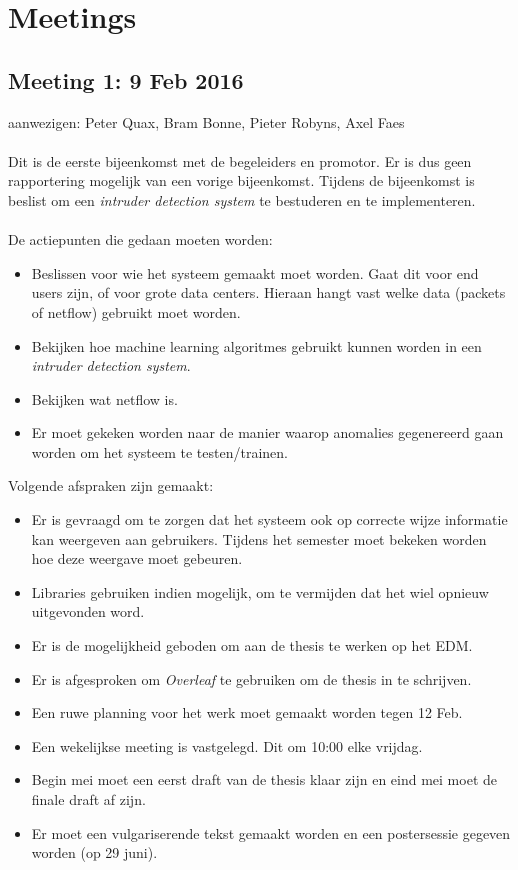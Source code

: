 
\chapter{Meetings} %

\label{AppendixA} %

\section{Meeting 1: 9 Feb 2016}

aanwezigen: Peter Quax, Bram Bonne, Pieter Robyns, Axel Faes\\
\\
Dit is de eerste bijeenkomst met de begeleiders en promotor. Er is dus geen rapportering mogelijk van een vorige bijeenkomst. Tijdens de bijeenkomst is beslist om een \textit{intruder detection system} te bestuderen en te implementeren. \\
\\
De actiepunten die gedaan moeten worden:
\begin{itemize}  
        \item Beslissen voor wie het systeem gemaakt moet worden. Gaat dit voor end users zijn, of voor grote data centers. Hieraan hangt vast welke data (packets of netflow) gebruikt moet worden.
        \item Bekijken hoe machine learning algoritmes gebruikt kunnen worden in een \textit{intruder detection system}.
        \item Bekijken wat netflow is.
        \item Er moet gekeken worden naar de manier waarop anomalies gegenereerd gaan worden om het systeem te testen/trainen.
\end{itemize}

\noindent Volgende afspraken zijn gemaakt:
\begin{itemize}  
		\item Er is gevraagd om te zorgen dat het systeem ook op correcte wijze informatie kan weergeven aan gebruikers. Tijdens het semester moet bekeken worden hoe deze weergave moet gebeuren.
        \item Libraries gebruiken indien mogelijk, om te vermijden dat het wiel opnieuw uitgevonden word.
        \item Er is de mogelijkheid geboden om aan de thesis te werken op het EDM.
        \item Er is afgesproken om \textit{Overleaf} te gebruiken om de thesis in te schrijven.
        \item Een ruwe planning voor het werk moet gemaakt worden tegen 12 Feb.
        \item Een wekelijkse meeting is vastgelegd. Dit om 10:00 elke vrijdag.
        \item Begin mei moet een eerst draft van de thesis klaar zijn en eind mei moet de finale draft af zijn. 
        \item Er moet een vulgariserende tekst gemaakt worden en een postersessie gegeven worden (op 29 juni).
\end{itemize}
